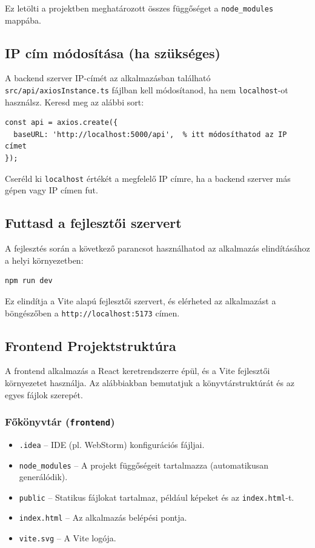 \documentclass{report}[11pt]
\begin{document}
Ez letölti a projektben meghatározott összes függőséget a \texttt{node\_modules} mappába.

\subsection{IP cím módosítása (ha szükséges)}

A backend szerver IP-címét az alkalmazásban található \texttt{src/api/axiosInstance.ts} fájlban kell módosítanod, ha nem \texttt{localhost}-ot használsz. Keresd meg az alábbi sort:

\begin{verbatim}
const api = axios.create({
  baseURL: 'http://localhost:5000/api',  % itt módosíthatod az IP címet
});
\end{verbatim}

Cseréld ki \texttt{localhost} értékét a megfelelő IP címre, ha a backend szerver más gépen vagy IP címen fut.

\subsection{Futtasd a fejlesztői szervert}

A fejlesztés során a következő parancsot használhatod az alkalmazás elindításához a helyi környezetben:

\begin{verbatim}
npm run dev
\end{verbatim}

Ez elindítja a Vite alapú fejlesztői szervert, és elérheted az alkalmazást a böngészőben a \texttt{http://localhost:5173} címen.

\subsection{Frontend Projektstruktúra}

A frontend alkalmazás a React keretrendszerre épül, és a Vite fejlesztői környezetet használja. Az alábbiakban bemutatjuk a könyvtárstruktúrát és az egyes fájlok szerepét.

\subsubsection{Főkönyvtár (\texttt{frontend})}

\begin{itemize}
    \item \texttt{.idea} – IDE (pl. WebStorm) konfigurációs fájljai.
    \item \texttt{node\_modules} – A projekt függőségeit tartalmazza (automatikusan generálódik).
    \item \texttt{public} – Statikus fájlokat tartalmaz, például képeket és az \texttt{index.html}-t.
    \item \texttt{index.html} – Az alkalmazás belépési pontja.
    \item \texttt{vite.svg} – A Vite logója.
\end{itemize}
\end{document}
